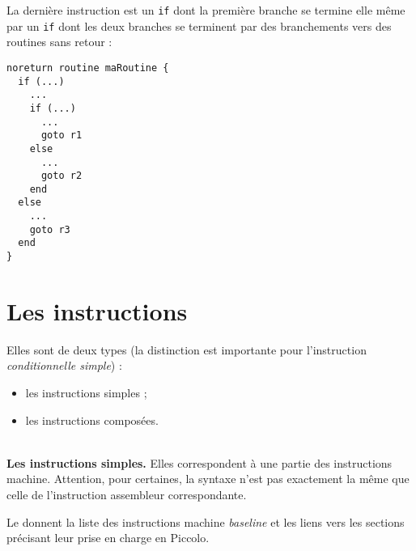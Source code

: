 La dernière instruction est un \texttt{if} dont la première branche se termine elle même par un \texttt{if} dont les deux branches se terminent par des branchements vers des routines sans retour :
\begin{lstlisting}[language=piccolo]
noreturn routine maRoutine {
  if (...)
    ...
    if (...)
      ...
      goto r1
    else
      ...
      goto r2
    end
  else
    ...
    goto r3
  end
}
\end{lstlisting}









\section{Les instructions}

Elles sont de deux types (la distinction est importante pour l’instruction \emph{conditionnelle simple}) :
\begin{itemize}
  \item les instructions simples ;
  \item les instructions composées.

\end{itemize}


~\\
\textbf{Les instructions simples.} Elles correspondent à une partie des instructions machine. Attention, pour certaines, la syntaxe n'est pas exactement la même que celle de l'instruction assembleur correspondante.

Le  donnent la liste des instructions machine \emph{baseline} et les liens vers les sections précisant leur prise en charge en Piccolo.

